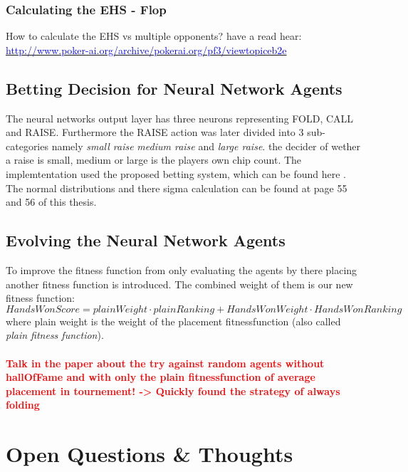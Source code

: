 \subsection{Calculating the EHS - Flop}
How to calculate the EHS vs multiple opponents? have a read hear:\\
\href{http://www.poker-ai.org/archive/pokerai.org/pf3/viewtopiceb2e.html?f=3&t=444&start=20&st=0&sk=t&sd=a&hilit=lut}{\textcolor{blue}{http://www.poker-ai.org/archive/pokerai.org/pf3/viewtopiceb2e}}

\section{Betting Decision for Neural Network Agents}
The neural networks output layer has three neurons representing FOLD, CALL and RAISE. Furthermore the RAISE action was later divided into 3 sub-categories namely \textit{small raise} \textit{medium raise} and \textit{large raise}. the decider of wether a raise is small, medium or large is the players own chip count. The implemtentation used the proposed betting system, which can be found here \cite{master_evo}. The normal distributions and there sigma calculation can be found at page 55 and 56 of this thesis.
\section{Evolving the Neural Network Agents}
To improve the fitness function from only evaluating the agents by there placing another fitness function is introduced. The combined weight of them is our new fitness function:
\begin{equation}
HandsWonScore = plainWeight \cdot plainRanking + HandsWonWeight \cdot HandsWonRanking
\end{equation}
where plain weight is the weight of the placement fitnessfunction (also called \textit{plain fitness function}).\\\\
\textbf{\textcolor{red}{Talk in the paper about the try against random agents without hallOfFame and with only the plain fitnessfunction of average placement in tournement! -> Quickly found the strategy of always folding}}

\pagebreak
\chapter{Open Questions \& Thoughts}
